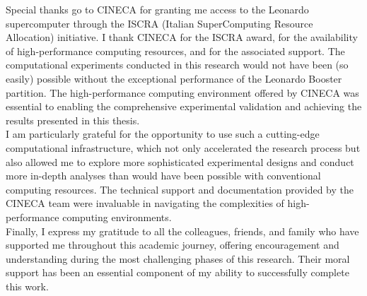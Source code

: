 \documentclass[12pt,a4paper]{article}
\begin{document}
Special thanks go to CINECA for granting me access to the Leonardo supercomputer through the ISCRA (Italian SuperComputing Resource Allocation) initiative. I thank CINECA for the ISCRA award, for the availability of high-performance computing resources, and for the associated support. The computational experiments conducted in this research would not have been (so easily) possible without the exceptional performance of the Leonardo Booster partition. The high-performance computing environment offered by CINECA was essential to enabling the comprehensive experimental validation and achieving the results presented in this thesis.\\

I am particularly grateful for the opportunity to use such a cutting-edge computational infrastructure, which not only accelerated the research process but also allowed me to explore more sophisticated experimental designs and conduct more in-depth analyses than would have been possible with conventional computing resources. The technical support and documentation provided by the CINECA team were invaluable in navigating the complexities of high-performance computing environments.\\

Finally, I express my gratitude to all the colleagues, friends, and family who have supported me throughout this academic journey, offering encouragement and understanding during the most challenging phases of this research. Their moral support has been an essential component of my ability to successfully complete this work.\\



\end{document}
